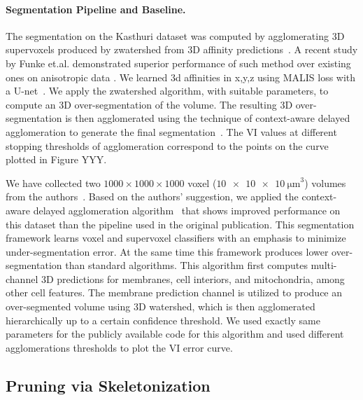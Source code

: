 \paragraph{Segmentation Pipeline and Baseline.}
\label{sec:neuroproof}
The segmentation on the Kasthuri dataset was computed by agglomerating 3D supervoxels produced by zwatershed from 3D affinity predictions~\cite{zlateski2015image}. 
A recent study by Funke et.al. demonstrated superior performance of such method over existing ones on anisotropic data \cite{schlegel2017learning}. 
We learned 3d affinities in x,y,z using MALIS loss with a U-net~\cite{Turaga:2009,ronneberger2015u}. 
We apply the zwatershed algorithm, with suitable parameters, to compute an 3D over-segmentation of the volume. 
The resulting 3D over-segmentation is then agglomerated using the technique of context-aware delayed agglomeration to generate the final segmentation~\cite{10.1371/journal.pone.0125825}. 
The VI values at different stopping thresholds of agglomeration correspond to the points on the curve plotted in Figure YYY.

We have collected two $1000 \times 1000 \times 1000$ voxel ($\SI[product-units=single]{10x10x10}{\micro\meter}^3$) volumes from the authors~\cite{takemura2017connectome}. 
Based on the authors' suggestion, we applied the context-aware delayed agglomeration algorithm~\cite{10.1371/journal.pone.0125825} that shows improved performance on this dataset than the pipeline used in the original publication. 
This segmentation framework learns voxel and supervoxel classifiers with an emphasis to minimize under-segmentation error.
At the same time this framework produces lower over-segmentation than standard algorithms. 
This algorithm first computes multi-channel 3D predictions for membranes, cell interiors, and mitochondria, among other cell features. 
The membrane prediction channel is utilized to produce an over-segmented volume using 3D watershed, which is then agglomerated hierarchically up to a certain confidence threshold. 
We used exactly same parameters for the publicly available code for this algorithm and used different agglomerations thresholds to plot the VI error curve.

\subsection{Pruning via Skeletonization}

